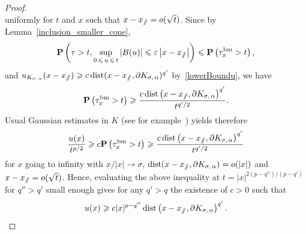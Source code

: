 \documentclass[10pt]{amsart}
\theoremstyle{definition}\newtheorem{defi}[theo]{Definition}\newtheorem{rema}[theo]{Remark}\newtheorem{exam}[theo]{Example}\newtheorem{exem}[theo]{Example}\newtheorem{nota}[theo]{Notation}
\DeclareMathOperator{\bm}{bm}
\DeclareMathOperator{\dist}{dist}
\newcommand{\pr}{\mathbf{P}}
\renewcommand{\epsilon}{\varepsilon}
\renewcommand{\leq}{\leqslant}
\renewcommand{\geq}{\geqslant}
\newcommand{\sslash}{\slash\mkern-6.4mu\slash}
\begin{document}
\begin{proof}
\[\]
uniformly for $t$ and $x$ such that $x-x_{\sslash}=o(\sqrt{t})$. Since by Lemma~\ref{inclusion_smaller_cone},
\[
\pr\left(\tau>t, \sup_{0\,\leq\,u\,\leq\,t}|B(u)|\leq \epsilon \left|x-x_{\sslash}\right|\right)\leq \pr\left(\tau^{\bm}_{x}>t\right),
\]
and $u_{K_{\sigma,\,\alpha}}(x-x_{\sslash})\geq c \dist(x-x_{\sslash},\partial K_{\sigma,\,\alpha})^{q'}$ by~\eqref{lowerBoundu}, we have
\[
\pr\left(\tau^{\bm}_{x}>t\right)\geq \frac{c \dist\left(x-x_{\sslash},\partial K_{\sigma,\,\alpha}\right)^{q'}}{t^{q'/2}}.
\]
Usual Gaussian estimates in $K$ (see for example~\cite[Appendix~A]{RaTa-20}) yields therefore
\[
\frac{u(x)}{t^{p/2}}\geq c\pr\left(\tau_{x}^{\bm}>t\right)\geq \frac{c\dist\left(x-x_{\sslash},\partial K_{\sigma,\,\alpha}\right)^{q'}}{t^{q'/2}}
\]
for $x$ going to infinity with $x/| x|\rightarrow \sigma$, $\dist(x-x_{\sslash},\partial K_{\sigma,\,\alpha})=o(| x |)$ and $x-x_{\sslash}=o(\sqrt{t})$. Hence, evaluating the above inequality at $t=|x| ^{2(p-q'')/(p-q')}$ for $q''>q'$ small enough gives for any $q'>q$ the existence of $c>0$ such that
\[
u(x)\geq c |x|^{p-q''}\dist\left(x-x_{\sslash},\partial K_{\sigma,\,\alpha}\right)^{q'}.\qedhere
\]
\end{proof}
\vspace{40pt}
\end{document}
